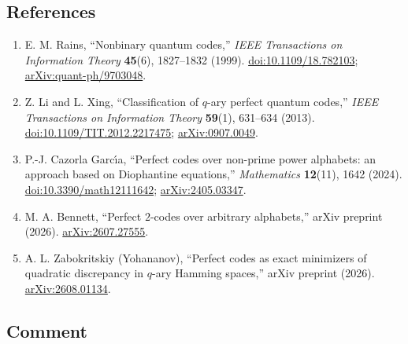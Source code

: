 \subsection*{References}

\begin{enumerate}[label={},leftmargin=4.8em,labelsep=0.5em]
  \footnotesize
  \item[\textup{[Rai99]}]\label{ref:644f-rains}
  E. M. Rains, ``Nonbinary quantum codes,'' \emph{IEEE Transactions on
  Information Theory} \textbf{45}(6), 1827--1832 (1999).
  \href{https://doi.org/10.1109/18.782103}{doi:10.1109/18.782103};
  \href{https://arxiv.org/abs/quant-ph/9703048}{arXiv:quant-ph/9703048}.

  \item[\textup{[LX13]}]\label{ref:644f-li-xing}
  Z. Li and L. Xing, ``Classification of $q$-ary perfect quantum codes,''
  \emph{IEEE Transactions on Information Theory} \textbf{59}(1), 631--634 (2013).
  \href{https://doi.org/10.1109/TIT.2012.2217475}{doi:10.1109/TIT.2012.2217475};
  \href{https://arxiv.org/abs/0907.0049}{arXiv:0907.0049}.

  \item[\textup{[Caz24]}]\label{ref:644f-cazorla-garcia}
  P.-J. Cazorla Garc\'{\i}a, ``Perfect codes over non-prime power alphabets: an
  approach based on Diophantine equations,'' \emph{Mathematics} \textbf{12}(11),
  1642 (2024).
  \href{https://doi.org/10.3390/math12111642}{doi:10.3390/math12111642};
  \href{https://arxiv.org/abs/2405.03347}{arXiv:2405.03347}.

  \item[\textup{[Ben26]}]\label{ref:644f-bennett}
  M. A. Bennett, ``Perfect $2$-codes over arbitrary alphabets,'' arXiv preprint
  (2026).
  \href{https://arxiv.org/abs/2607.27555}{arXiv:2607.27555}.

  \item[\textup{[Zab26]}]\label{ref:644f-zabokritskiy}
  A. L. Zabokritskiy (Yohananov), ``Perfect codes as exact minimizers of
  quadratic discrepancy in $q$-ary Hamming spaces,'' arXiv preprint (2026).
  \href{https://arxiv.org/abs/2608.01134}{arXiv:2608.01134}.
\end{enumerate}

\subsection*{Comment}


